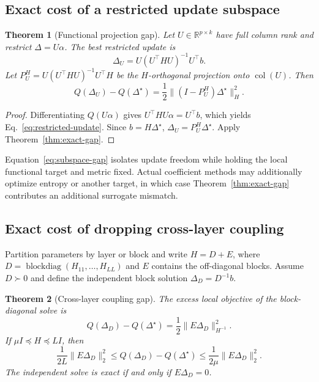 \documentclass[letterpaper]{article} %
\theoremstyle{plain}
\newtheorem{theorem}{Theorem}
\theoremstyle{definition}
\begin{document}
\subsection{Exact cost of a restricted update subspace}
\label{app:subspace-gap}

\begin{theorem}[Functional projection gap]
\label{thm:subspace-gap}
Let $U\in\mathbb R^{p\times k}$ have full column rank and restrict
$\Delta=U\alpha$. The best restricted update is
\begin{equation}
\Delta_U
=U(U^\top HU)^{-1}U^\top b.
\label{eq:restricted-update}
\end{equation}
Let
$P_U^H=U(U^\top HU)^{-1}U^\top H$ be the $H$-orthogonal projection onto
$\operatorname{col}(U)$. Then
\begin{equation}
Q(\Delta_U)-Q(\Delta^\star)
=\frac12\|(I-P_U^H)\Delta^\star\|_H^2.
\label{eq:subspace-gap}
\end{equation}
\end{theorem}

\begin{proof}
Differentiating $Q(U\alpha)$ gives
$U^\top HU\alpha=U^\top b$, which yields
Eq.~\eqref{eq:restricted-update}. Since $b=H\Delta^\star$,
$\Delta_U=P_U^H\Delta^\star$. Apply Theorem~\ref{thm:exact-gap}.
\end{proof}

Equation~\eqref{eq:subspace-gap} isolates update freedom while holding the local
functional target and metric fixed. Actual coefficient methods may additionally optimize
entropy or another target, in which case Theorem~\ref{thm:exact-gap} contributes an
additional surrogate mismatch.

\subsection{Exact cost of dropping cross-layer coupling}
\label{app:cross-layer-gap}

Partition parameters by layer or block and write
$H=D+E$, where $D=\operatorname{blockdiag}(H_{11},\ldots,H_{LL})$ and $E$ contains the
off-diagonal blocks. Assume $D\succ0$ and define the independent block solution
$\Delta_D=D^{-1}b$.

\begin{theorem}[Cross-layer coupling gap]
\label{thm:cross-layer-gap}
The excess local objective of the block-diagonal solve is
\begin{equation}
Q(\Delta_D)-Q(\Delta^\star)
=\frac12\|E\Delta_D\|_{H^{-1}}^2.
\label{eq:cross-layer-gap}
\end{equation}
If $\mu I\preceq H\preceq LI$, then
\begin{equation}
\frac{1}{2L}\|E\Delta_D\|_2^2
\le Q(\Delta_D)-Q(\Delta^\star)
\le\frac{1}{2\mu}\|E\Delta_D\|_2^2.
\label{eq:cross-layer-bounds}
\end{equation}
The independent solve is exact if and only if $E\Delta_D=0$.
\end{theorem}
\end{document}
